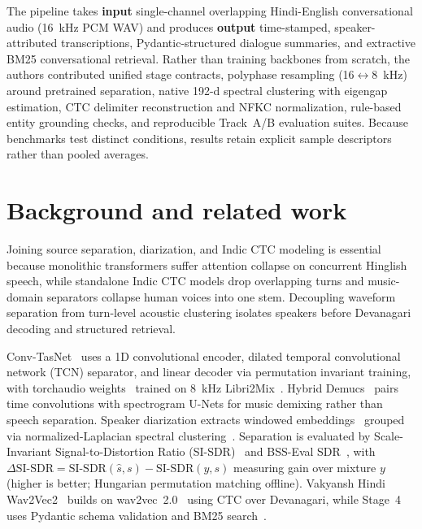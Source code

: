 \documentclass[11pt,a4paper,twocolumn]{article}
\begin{document}
The pipeline takes \textbf{input} single-channel overlapping Hindi-English conversational audio (16~kHz PCM WAV) and produces \textbf{output} time-stamped, speaker-attributed transcriptions, Pydantic-structured dialogue summaries, and extractive BM25 conversational retrieval. Rather than training backbones from scratch, the authors contributed unified stage contracts, polyphase resampling (16$\leftrightarrow$8~kHz) around pretrained separation, native 192-d spectral clustering with eigengap estimation, CTC delimiter reconstruction and NFKC normalization, rule-based entity grounding checks, and reproducible Track~A/B evaluation suites. Because benchmarks test distinct conditions, results retain explicit sample descriptors rather than pooled averages.

\section{Background and related work}
Joining source separation, diarization, and Indic CTC modeling is essential because monolithic transformers suffer attention collapse on concurrent Hinglish speech, while standalone Indic CTC models drop overlapping turns and music-domain separators collapse human voices into one stem. Decoupling waveform separation from turn-level acoustic clustering isolates speakers before Devanagari decoding and structured retrieval.

Conv-TasNet~\cite{luo2019convtasnet} uses a 1D convolutional encoder, dilated temporal convolutional network (TCN) separator, and linear decoder via permutation invariant training, with torchaudio weights~\cite{yang2022torchaudio} trained on 8~kHz Libri2Mix~\cite{cosentino2020librimix}. Hybrid Demucs~\cite{defossez2021demucs} pairs time convolutions with spectrogram U-Nets for music demixing rather than speech separation. Speaker diarization extracts windowed embeddings~\cite{bredin2020pyannote} grouped via normalized-Laplacian spectral clustering~\cite{ng2001spectral}. Separation is evaluated by Scale-Invariant Signal-to-Distortion Ratio (SI-SDR)~\cite{leroux2019sisdr} and BSS-Eval SDR~\cite{vincent2006performance}, with $\Delta\text{SI-SDR} = \text{SI-SDR}(\hat{s}, s) - \text{SI-SDR}(y, s)$ measuring gain over mixture $y$ (higher is better; Hungarian permutation matching offline). Vakyansh Hindi Wav2Vec2~\cite{chadha2021vakyansh} builds on wav2vec~2.0~\cite{baevski2020wav2vec} using CTC over Devanagari, while Stage~4 uses Pydantic schema validation and BM25 search~\cite{robertson2009bm25}.
\end{document}
